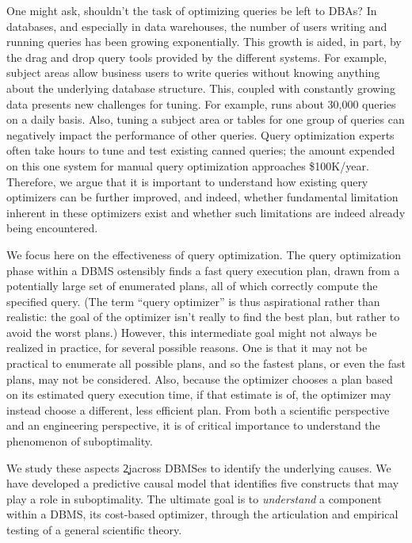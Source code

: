 \documentclass[prodmode,acmtods]{acmsmall}
\begin{document}
One might ask, shouldn't the task of optimizing queries be left to DBAs?  In
databases, and especially in data warehouses, the number of users writing
and running queries has been growing exponentially. This growth is aided, in
part, by the drag and drop query tools provided by the different
systems. For example, subject areas allow business users to write queries
without knowing anything about the underlying database structure. This,
coupled with constantly growing data presents new challenges for tuning. For
example,  runs about
30,000 queries on a daily basis. 
Also, tuning a subject area or tables for one group of queries can
negatively impact the performance of other queries. Query optimization experts often take hours to tune and test existing canned
queries; the amount expended on this one system for manual query optimization
approaches \$100K/year. Therefore, we argue that it is important to
understand how existing query optimizers can be further improved, and
indeed, whether  fundamental limitation inherent in these optimizers exist
and whether such limitations are indeed already being encountered.

We focus here on the effectiveness of query
optimization. The query optimization phase within a \hbox{DBMS} ostensibly
finds a fast query execution plan, drawn from a potentially large set of enumerated plans, all of
which correctly compute the specified query. (The term ``query optimizer'' is thus aspirational rather
than realistic: the goal of the optimizer isn't really to find the best
plan, but rather to avoid the worst plans.) However, this intermediate goal
might not always be realized in practice, for several possible reasons. One is
that it may not be practical to enumerate all possible plans, and so the
fastest plans, or even the fast plans, may not be considered. Also, because
the optimizer chooses a plan based on its estimated query execution time, if
that estimate is of, the optimizer may instead choose a different, less
efficient plan. From both a scientific perspective and an engineering
perspective, it is of critical importance to understand the phenomenon of
suboptimality.

We study these aspects \c2j{}{across \hbox{DBMSes}} to identify the
underlying causes. We have developed a predictive causal model that
identifies five constructs that may play a role in suboptimality. The ultimate goal is to {\em
  understand} a component within a \hbox{DBMS}, its cost-based optimizer, through the
articulation and empirical testing of a general scientific theory.
\end{document}
